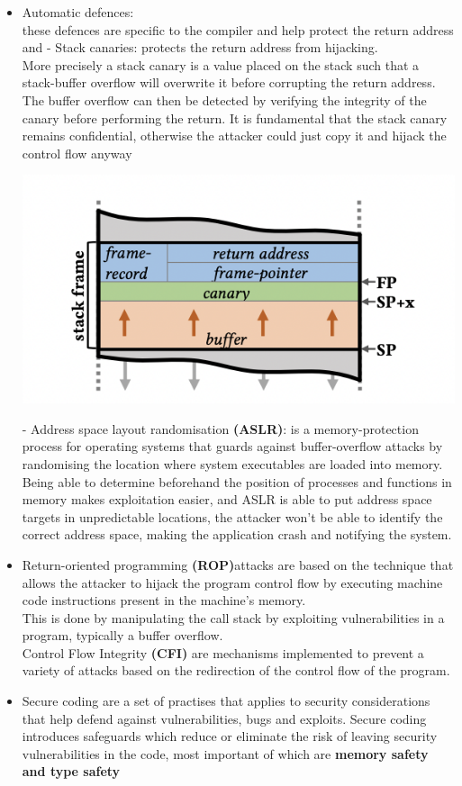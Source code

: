 \documentclass[11pt, oneside]{article}   	%
\begin{document}
\begin{itemize}

\item Automatic defences:\\
these defences are specific to the compiler and help protect the return address and
- Stack canaries: protects the return address from hijacking.\\
More precisely a stack canary is a value placed on the stack such that a stack-buffer overflow will overwrite it before corrupting the return address. The buffer overflow can then be detected by verifying the integrity of the canary before performing the return. It is fundamental that the stack canary remains confidential, otherwise the attacker could just copy it and hijack the control flow anyway
\begin{center}
\includegraphics[scale = 0.6]{canary}
\end{center}
- Address space layout randomisation \textbf{(ASLR)}: is a memory-protection process for operating systems that guards against buffer-overflow attacks by randomising the location where system executables are loaded into memory. \\Being able to determine beforehand the position of processes and functions in memory makes exploitation easier, and ASLR is able to put address space targets in unpredictable locations, the attacker won't be able to identify the correct address space, making the application crash and notifying the system.
\item Return-oriented programming \textbf{(ROP)}attacks are based on the technique that allows the attacker to hijack the program control flow by executing machine code instructions present in the machine's memory. \\
This is done by manipulating the call stack by exploiting vulnerabilities in a program, typically a buffer overflow.\\
Control Flow Integrity \textbf{(CFI)} are mechanisms implemented to prevent a variety of attacks based on the redirection of the control flow of the program.
\item Secure coding are a set of practises that applies to security considerations that help defend against vulnerabilities, bugs and exploits. Secure coding introduces safeguards which reduce or eliminate the risk of leaving security vulnerabilities in the code, most important of which are \textbf{memory safety and type safety}
\end{itemize}
\end{document}

